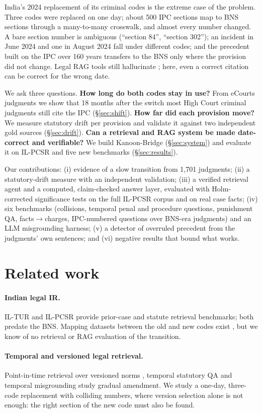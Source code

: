 \documentclass[11pt]{article}
\begin{document}
India's 2024 replacement of its criminal codes is the extreme case of the problem. Three codes
were replaced on one day; about 500 IPC sections map to BNS sections through a many-to-many
crosswalk, and almost every number changed. A bare section number is ambiguous (``section 84'',
``section 302''); an incident in June 2024 and one in August 2024 fall under different codes; and
the precedent built on the IPC over 160 years transfers to the BNS only where the provision did
not change. Legal RAG tools still hallucinate \citep{magesh2025}; here, even a correct citation can
be correct for the wrong date.

We ask three questions. \textbf{How long do both codes stay in use?} From eCourts judgments we show
that 18 months after the switch most High Court criminal judgments still cite the IPC
(\S\ref{sec:shift}). \textbf{How far did each provision move?} We measure statutory drift per
provision and validate it against two independent gold sources (\S\ref{sec:drift}).
\textbf{Can a retrieval and RAG system be made date-correct and verifiable?} We build Kanoon-Bridge
(\S\ref{sec:system}) and evaluate it on IL-PCSR \citep{ilpcsr} and five new benchmarks
(\S\ref{sec:results}).

Our contributions: (i) evidence of a slow transition from 1,701 judgments; (ii) a statutory-drift
measure with an independent validation; (iii) a verified retrieval agent and a computed,
claim-checked answer layer, evaluated with Holm-corrected significance tests on the full IL-PCSR
corpus and on real case facts; (iv) six benchmarks (collisions, temporal penal and procedure
questions, punishment QA, facts$\rightarrow$charges, IPC-numbered questions over BNS-era
judgments) and an LLM misgrounding harness; (v) a detector of overruled precedent from the
judgments' own sentences; and (vi) negative results that bound what works.

\section{Related work}
\paragraph{Indian legal IR.} IL-TUR \citep{iltur} and IL-PCSR \citep{ilpcsr} provide prior-case and
statute retrieval benchmarks; both predate the BNS. Mapping datasets between the old and new codes
exist \citep{ieeemapping}, but we know of no retrieval or RAG evaluation of the transition.
\paragraph{Temporal and versioned legal retrieval.} Point-in-time retrieval over versioned
norms \citep{satgraph,frbr}, temporal statutory QA \citep{oldfriend,timetravel} and temporal
misgrounding \citep{fiscalqa} study gradual amendment. We study a one-day, three-code
replacement with colliding numbers, where version selection alone is not enough: the right
section of the new code must also be found.
\end{document}
